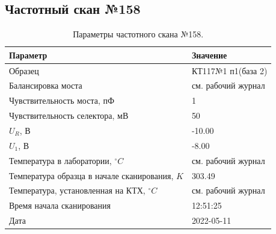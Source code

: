 \subsection{Частотный скан №158}
\begin{table}[!ht]
    \centering
    \caption{Параметры частотного скана №158.}
    \begin{tabular}{|l|l|}
        \hline
        Параметр                                       & Значение                  \\ \hline
        Образец                                        & КТ117№1 п1(база 2)        \\ \hline
        Балансировка моста                             & см. рабочий журнал        \\ \hline
        Чувствительность моста, пФ                     & 1                         \\ \hline
        Чувствительность селектора, мВ                 & 50                        \\ \hline
        $U_R$, В                                       & -10.00                    \\ \hline
        $U_1$, В                                       & -8.00                     \\ \hline
        Температура в лаборатории, $^\circ C$          & см. рабочий журнал        \\ \hline
        Температура образца в начале сканирования, $K$ & 303.49                    \\ \hline
        Температура, установленная на КТХ, $^\circ C$  & см. рабочий журнал        \\ \hline
        Время начала сканирования                      & 12:51:25                  \\ \hline
        Дата                                           & 2022-05-11                \\ \hline
    \end{tabular}
    \label{table:frequency_scan_158}
\end{table}

